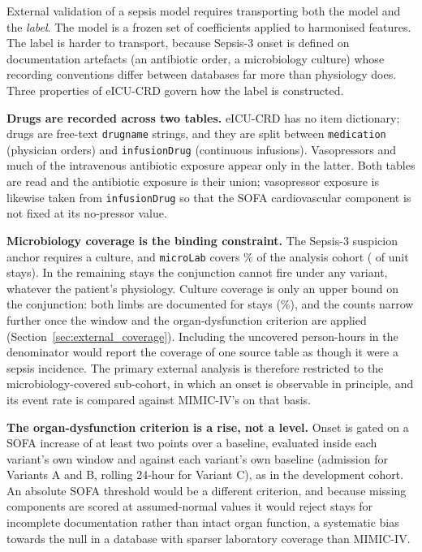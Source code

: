 External validation of a sepsis model requires transporting both the model and
the \emph{label}. The model is a frozen set of coefficients applied to
harmonised features. The label is harder to transport, because Sepsis-3 onset
is defined on documentation artefacts (an antibiotic order, a microbiology
culture) whose recording conventions differ between databases far more than
physiology does. Three properties of eICU-CRD govern how the label is
constructed.

\textbf{Drugs are recorded across two tables.} eICU-CRD has no item
dictionary; drugs are free-text \texttt{drugname} strings, and they are split
between \texttt{medication} (physician orders) and \texttt{infusionDrug}
(continuous infusions). Vasopressors and much of the intravenous antibiotic
exposure appear only in the latter. Both tables are read and the antibiotic
exposure is their union; vasopressor exposure is likewise taken from
\texttt{infusionDrug} so that the SOFA cardiovascular component is not fixed at
its no-pressor value.

\textbf{Microbiology coverage is the binding constraint.} The Sepsis-3
suspicion anchor requires a culture, and \texttt{microLab} covers
\pcExtMicroCoverage\% of the analysis cohort (\pcExtNMicroStays{} of
\pcExtNCohortStays{} unit stays). In the remaining stays the conjunction cannot
fire under any variant, whatever the patient's physiology. Culture coverage is
only an upper bound on the conjunction: both limbs are documented for
\pcExtNBothLimbStays{} stays (\pcExtBothLimbCoverage\%), and the counts narrow
further once the window and the organ-dysfunction criterion are applied
(Section~\ref{sec:external_coverage}). Including the uncovered person-hours in
the denominator would report the coverage of one source table as though it were
a sepsis incidence. The primary external analysis is therefore restricted to
the microbiology-covered sub-cohort, in which an onset is observable in
principle, and its event rate is compared against MIMIC-IV's on that basis.

\textbf{The organ-dysfunction criterion is a rise, not a level.} Onset is
gated on a SOFA increase of at least two points over a baseline, evaluated
inside each variant's own window and against each variant's own baseline
(admission for Variants A and B, rolling 24-hour for Variant C), as in the
development cohort. An absolute SOFA threshold would be a different criterion,
and because missing components are scored at assumed-normal values it would
reject stays for incomplete documentation rather than intact organ function, a
systematic bias towards the null in a database with sparser laboratory coverage
than MIMIC-IV.


